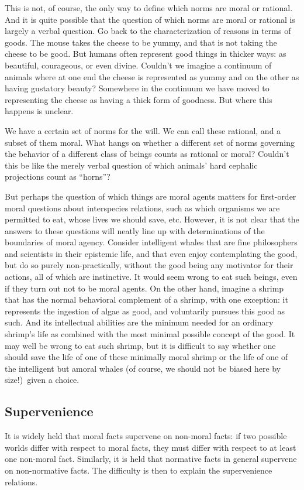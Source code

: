 This is not, of course, the only way to define which norms are moral or rational. And it is quite possible that the question of which
norms are moral or rational is largely a verbal question. Go back to the characterization of reasons in terms of goods. The mouse takes
the cheese to be yummy, and that is not taking the cheese to be good. But humans often represent good things in thicker ways: as
beautiful, courageous, or even divine. Couldn't we imagine a continuum of animals where at one end the cheese is represented as 
yummy and on the other as having gustatory beauty? Somewhere in the continuum we have moved to representing the cheese as having a 
thick form of goodness. But where this happens is unclear. 

We have a certain set of norms for the will. We can call these rational, and a subset of them moral. What hangs on whether a different
set of norms governing the behavior of a different class of beings counts as rational or moral? Couldn't this be like the merely verbal question of
which animals' hard cephalic projections count as ``horns''? 

But perhaps the question of which things are moral agents matters for first-order moral questions about interspecies relations, such 
as which organisms we are permitted to eat, whose lives we should save, etc. However, it is not clear that the answers to these questions will neatly line up with
determinations of the boundaries of moral agency. Consider intelligent whales that are fine philosophers and scientists in their epistemic life, 
and that even enjoy contemplating the good, but do so purely non-practically, without the good being any motivator for their 
actions, all of which are instinctive. It would seem wrong to eat such beings, even if they turn out not to be moral agents.
On the other hand, imagine a shrimp that has the normal behavioral complement of a shrimp, with one exception: it represents
the ingestion of algae as good, and voluntarily pursues this good as such. And its intellectual abilities are the minimum needed
for an ordinary shrimp's life as combined with the most minimal possible concept of the good. It may well be wrong to eat such shrimp,
but it is difficult to say whether one should save the life of one of these minimally moral shrimp or the life of one of the intelligent but amoral 
whales (of course, we should not be biased here by size!)\ given a choice.

\subsection{Supervenience}
It is widely held that moral facts supervene on non-moral facts: if two possible worlds differ
with respect to moral facts, they must differ with respect to at least one non-moral fact. Similarly,
it is held that normative facts in general supervene on non-normative facts. The difficulty is then
to explain the supervenience relations.

